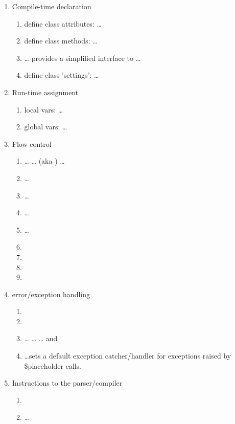 \begin{enumerate}
\item Compile-time declaration
     \begin{enumerate}
     \item define class attributes:  \ldots
     \item define class methods:  \ldots {}
     \item {} \ldots {} provides a simplified
          interface to  \ldots {}
     \item define class 'settings':  \ldots {}
     \end{enumerate}

\item Run-time assignment
     \begin{enumerate}
     \item local vars:  \ldots
     \item global vars:  \ldots
     \end{enumerate}

\item Flow control
     \begin{enumerate}
     \item {} \ldots {} \ldots {} (aka
          ) \ldots {}
     \item {} \ldots {}
     \item {} \ldots {}
     \item {} \ldots {}
     \item {} \ldots {}
     \item {}
     \item {}
     \item {}
     \item {}
     \end{enumerate}

\item error/exception handling
     \begin{enumerate}
     \item {}
     \item {}
     \item {} \ldots {} \ldots {} \ldots
           and  
     \item {} \ldots sets a default exception catcher/handler for
          exceptions raised by \$placeholder calls.
     \end{enumerate}

\item Instructions to the parser/compiler
     \begin{enumerate}
     \item {}
     \item {} \ldots {}
     \end{enumerate}
\end{enumerate}

